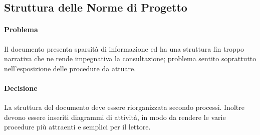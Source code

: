 \subsection{Struttura delle Norme di Progetto}
\paragraph{Problema} Il documento presenta sparsità di informazione ed ha una struttura fin troppo narrativa che ne rende impegnativa la consultazione; problema sentito soprattutto nell'esposizione delle procedure da attuare.
\paragraph{Decisione} La struttura del documento deve essere riorganizzata secondo processi. Inoltre devono essere inseriti diagrammi di attività, in modo da rendere le varie procedure più attraenti e semplici per il lettore.
